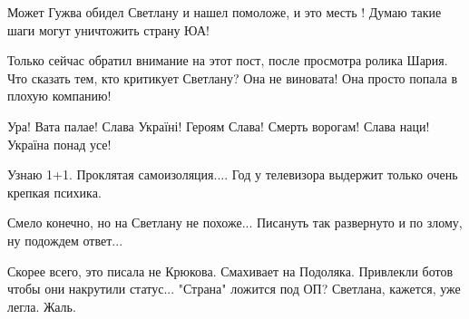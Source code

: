 \begin{itemize}
Может Гужва обидел Светлану и нашел помоложе, и это месть ! Думаю такие шаги могут уничтожить страну ЮА!

 
Только сейчас обратил внимание на этот пост, после просмотра ролика Шария. Что
сказать тем, кто критикует Светлану? Она не виновата! Она просто попала в
плохую компанию!

 
Ура! Вата палае! Слава Україні! Героям Слава! Смерть ворогам! Слава наци! Україна понад усе!

 
Узнаю 1+1. Проклятая самоизоляция.... Год у телевизора выдержит только очень крепкая психика.

 
Смело конечно, но на Светлану не похоже... Писануть так развернуто и по злому, ну подождем ответ...

 

Скорее всего, это писала не Крюкова. Смахивает на Подоляка. Привлекли ботов
чтобы они накрутили статус... "Страна" ложится под ОП? Светлана, кажется, уже
легла. Жаль.


 

\end{itemize}
